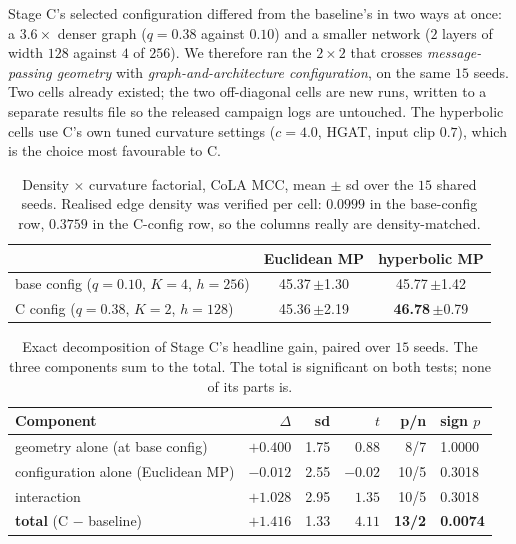 \documentclass{article}
\begin{document}
Stage C's selected configuration differed from the baseline's in two ways at
once: a $3.6\times$ denser graph ($q=0.38$ against $0.10$) and a smaller network
($2$ layers of width $128$ against $4$ of $256$). We therefore ran the
$2\times2$ that crosses \emph{message-passing geometry} with
\emph{graph-and-architecture configuration}, on the same $15$ seeds. Two cells
already existed; the two off-diagonal cells are new runs, written to a separate
results file so the released campaign logs are untouched. The hyperbolic cells
use C's own tuned curvature settings ($c = 4.0$, HGAT, input clip $0.7$), which
is the choice most favourable to C.

\begin{table}[h]
\caption{Density $\times$ curvature factorial, CoLA MCC, mean $\pm$ sd over the
$15$ shared seeds. Realised edge density was verified per cell: $0.0999$ in the
base-config row, $0.3759$ in the C-config row, so the columns really are
density-matched.}
\label{tab:factorial}
\begin{center}
\small
\begin{tabular}{lcc}
\toprule
 & Euclidean MP & hyperbolic MP \\
\midrule
base config ($q{=}0.10$, $K{=}4$, $h{=}256$) & 45.37\,$\pm$1.30 & 45.77\,$\pm$1.42 \\
C config ($q{=}0.38$, $K{=}2$, $h{=}128$)    & 45.36\,$\pm$2.19 & \textbf{46.78}\,$\pm$0.79 \\
\bottomrule
\end{tabular}
\end{center}
\end{table}

\begin{table}[h]
\caption{Exact decomposition of Stage C's headline gain, paired over $15$ seeds.
The three components sum to the total. The total is significant on both tests;
none of its parts is.}
\label{tab:decomp}
\begin{center}
\small
\begin{tabular}{lrrrrl}
\toprule
Component & $\Delta$ & sd & $t$ & p/n & sign $p$ \\
\midrule
geometry alone (at base config)      & $+0.400$ & 1.75 & $0.88$ & \phantom{0}8/7 & 1.0000 \\
configuration alone (Euclidean MP)   & $-0.012$ & 2.55 & $-0.02$ & 10/5 & 0.3018 \\
interaction                          & $+1.028$ & 2.95 & $1.35$ & 10/5 & 0.3018 \\
\midrule
\textbf{total} (C $-$ baseline)      & $\mathbf{+1.416}$ & 1.33 & $\mathbf{4.11}$ & \textbf{13/2} & \textbf{0.0074} \\
\bottomrule
\end{tabular}
\end{center}
\end{table}
\end{document}
